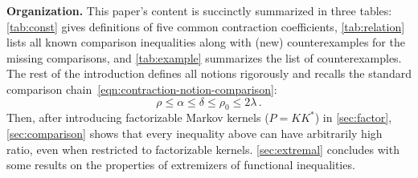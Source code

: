 \documentclass[11pt]{article}
\newcommand{\zongchen}[1]{{\color{teal}[Zongchen: #1]}}
\theoremstyle{definition}
\begin{document}
%


%


\medskip
\textbf{Organization.} This paper's content is succinctly summarized in three tables: \cref{tab:const} gives
definitions of five common contraction coefficients, \cref{tab:relation} lists all known comparison inequalities
along with (new) counterexamples for the missing comparisons, and \cref{tab:example} summarizes the list of
counterexamples. The rest of the introduction defines all notions rigorously and recalls the standard
comparison chain~\cref{eqn:contraction-notion-comparison}:
$$ \rho \le \alpha \le \delta \le \rho_0 \le 2\lambda\,. $$
Then, after introducing factorizable Markov kernels ($P=KK^*$) in \cref{sec:factor},
\cref{sec:comparison} shows that every inequality above can have arbitrarily high ratio,
even when restricted to factorizable kernels. \cref{sec:extremal} concludes with some
results on the properties of extremizers of functional inequalities.
\end{document}
